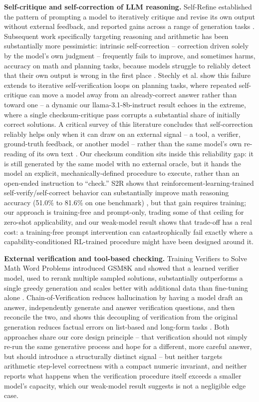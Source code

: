 \documentclass[11pt,letterpaper]{article}
\begin{document}
\textbf{Self-critique and self-correction of LLM reasoning.} Self-Refine established the pattern of prompting a model to iteratively critique and revise its own output without external feedback, and reported gains across a range of generation tasks \citep{Madaan2023}. Subsequent work specifically targeting reasoning and arithmetic has been substantially more pessimistic: intrinsic self-correction -- correction driven solely by the model's own judgment -- frequently fails to improve, and sometimes harms, accuracy on math and planning tasks, because models struggle to reliably detect that their own output is wrong in the first place \citep{Huang2023,Kamoi2024,Stechly2024}. Stechly et al. show this failure extends to iterative self-verification loops on planning tasks, where repeated self-critique can move a model away from an already-correct answer rather than toward one \citep{Stechly2024} -- a dynamic our llama-3.1-8b-instruct result echoes in the extreme, where a single checksum-critique pass corrupts a substantial share of initially correct solutions. A critical survey of this literature concludes that self-correction reliably helps only when it can draw on an external signal -- a tool, a verifier, ground-truth feedback, or another model -- rather than the same model's own re-reading of its own text \citep{Kamoi2024}. Our checksum condition sits inside this reliability gap: it is still generated by the same model with no external oracle, but it hands the model an explicit, mechanically-defined procedure to execute, rather than an open-ended instruction to ``check.'' S2R shows that reinforcement-learning-trained self-verify/self-correct behavior can substantially improve math reasoning accuracy (51.0\% to 81.6\% on one benchmark) \citep{Ma2025}, but that gain requires training; our approach is training-free and prompt-only, trading some of that ceiling for zero-shot applicability, and our weak-model result shows that trade-off has a real cost: a training-free prompt intervention can catastrophically fail exactly where a capability-conditioned RL-trained procedure might have been designed around it.

\textbf{External verification and tool-based checking.} Training Verifiers to Solve Math Word Problems introduced GSM8K and showed that a learned verifier model, used to rerank multiple sampled solutions, substantially outperforms a single greedy generation and scales better with additional data than fine-tuning alone \citep{Cobbe2021}. Chain-of-Verification reduces hallucination by having a model draft an answer, independently generate and answer verification questions, and then reconcile the two, and shows this decoupling of verification from the original generation reduces factual errors on list-based and long-form tasks \citep{Dhuliawala2023}. Both approaches share our core design principle -- that verification should not simply re-run the same generative process and hope for a different, more careful answer, but should introduce a structurally distinct signal -- but neither targets arithmetic step-level correctness with a compact numeric invariant, and neither reports what happens when the verification procedure itself exceeds a smaller model's capacity, which our weak-model result suggests is not a negligible edge case.
\end{document}
